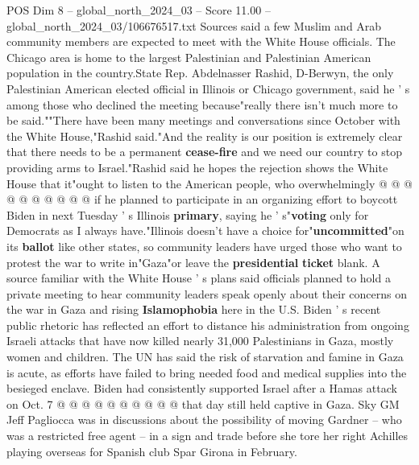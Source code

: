 \begin{textsample}{POS Dim 8 – global\_north\_2024\_03 – Score 11.00 – global\_north\_2024\_03/106676517.txt}
Sources said a few Muslim and Arab community members are expected to meet with the White House officials.
The Chicago area is home to the largest Palestinian and Palestinian American population in the country.State Rep.
Abdelnasser Rashid, D-Berwyn, the only Palestinian American elected official in Illinois or Chicago government, said he ' s among those who declined the meeting because"really there isn't much more to be said.""There have been many meetings and conversations since October with the White House,"Rashid said."And the reality is our position is extremely clear that there needs to be a permanent \textbf{cease-fire} and we need our country to stop providing arms to Israel."Rashid said he hopes the rejection shows the White House that it"ought to listen to the American people, who overwhelmingly @ @ @ @ @ @ @ @ @ @ if he planned to participate in an organizing effort to boycott Biden in next Tuesday ' s Illinois \textbf{primary}, saying he ' s"\textbf{voting} only for Democrats as I always have."Illinois doesn't have a choice for"\textbf{uncommitted}"on its \textbf{ballot} like other states, so community leaders have urged those who want to protest the war to write in"Gaza"or leave the \textbf{presidential} \textbf{ticket} blank.
A source familiar with the White House ' s plans said officials planned to hold a private meeting to hear community leaders speak openly about their concerns on the war in Gaza and rising \textbf{Islamophobia} here in the U.S.
Biden ' s recent public rhetoric has reflected an effort to distance his administration from ongoing Israeli attacks that have now killed nearly 31,000 Palestinians in Gaza, mostly women and children.
The UN has said the risk of starvation and famine in Gaza is acute, as efforts have failed to bring needed food and medical supplies into the besieged enclave.
Biden had consistently supported Israel after a Hamas attack on Oct. 7 @ @ @ @ @ @ @ @ @ @ that day still held captive in Gaza.
Sky GM Jeff Pagliocca was in discussions about the possibility of moving Gardner -- who was a restricted free agent -- in a sign and trade before she tore her right Achilles playing overseas for Spanish club Spar Girona in February.

\end{textsample}
